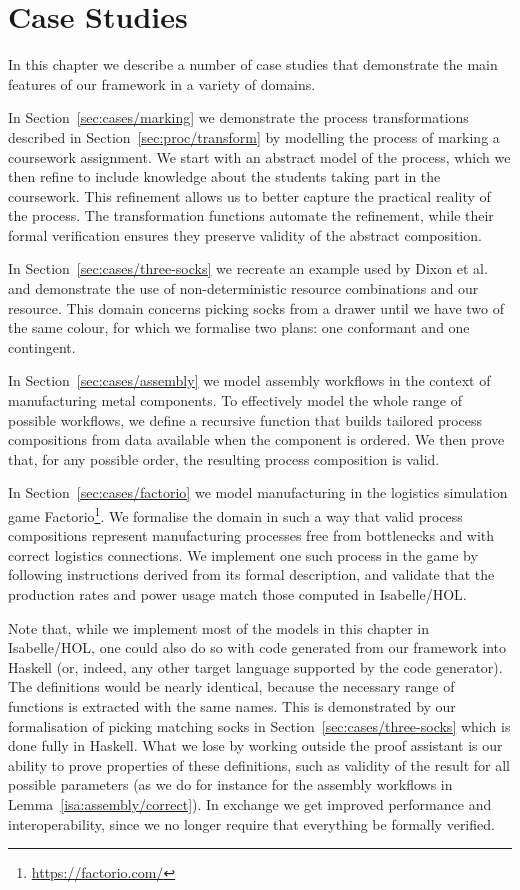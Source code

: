 \documentclass[class=smolathesis,crop=false]{standalone}
\begin{document}
\chapter{Case Studies}
\label{ch:cases}

In this chapter we describe a number of case studies that demonstrate the main features of our framework in a variety of domains.

In Section~\ref{sec:cases/marking} we demonstrate the process transformations described in Section~\ref{sec:proc/transform} by modelling the process of marking a coursework assignment.
We start with an abstract model of the process, which we then refine to include knowledge about the students taking part in the coursework.
This refinement allows us to better capture the practical reality of the process.
The transformation functions automate the refinement, while their formal verification ensures they preserve validity of the abstract composition.

In Section~\ref{sec:cases/three-socks} we recreate an example used by Dixon et al.~\cite{dixon_et_al-2009} and demonstrate the use of non-deterministic resource combinations and our  resource.
This domain concerns picking socks from a drawer until we have two of the same colour, for which we formalise two plans: one conformant and one contingent.

In Section~\ref{sec:cases/assembly} we model assembly workflows in the context of manufacturing metal components.
To effectively model the whole range of possible workflows, we define a recursive function that builds tailored process compositions from data available when the component is ordered.
We then prove that, for any possible order, the resulting process composition is valid.

In Section~\ref{sec:cases/factorio} we model manufacturing in the logistics simulation game Factorio\footnote{\url{https://factorio.com/}}.
We formalise the domain in such a way that valid process compositions represent manufacturing processes free from bottlenecks and with correct logistics connections.
We implement one such process in the game by following instructions derived from its formal description, and validate that the production rates and power usage match those computed in Isabelle/HOL.

\cbstart
Note that, while we implement most of the models in this chapter in Isabelle/HOL, one could also do so with code generated from our framework into Haskell (or, indeed, any other target language supported by the code generator).
The definitions would be nearly identical, because the necessary range of functions is extracted with the same names.
This is demonstrated by our formalisation of picking matching socks in Section~\ref{sec:cases/three-socks} which is done fully in Haskell.
What we lose by working outside the proof assistant is our ability to prove properties of these definitions, such as validity of the result for all possible parameters (as we do for instance for the assembly workflows in Lemma~\ref{isa:assembly/correct}).
In exchange we get improved performance and interoperability, since we no longer require that everything be formally verified.
\cbend
\end{document}
